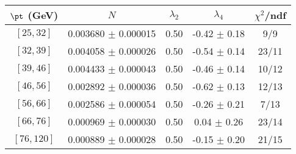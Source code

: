 \begin{tabular}{c||c|c|c|c}
$\pt$ (GeV) & $N$ & $\lambda_{2}$ & $\lambda_4$  & $\chi^2$/ndf  \\
\hline
$[25, 32]$ & 0.003680 $\pm$ 0.000015 & 0.50 & -0.42 $\pm$ 0.18 & 9/9\\
$[32, 39]$ & 0.004058 $\pm$ 0.000026 & 0.50 & -0.54 $\pm$ 0.14 & 23/11\\
$[39, 46]$ & 0.004433 $\pm$ 0.000043 & 0.50 & -0.46 $\pm$ 0.14 & 10/12\\
$[46, 56]$ & 0.002892 $\pm$ 0.000036 & 0.50 & -0.62 $\pm$ 0.13 & 12/13\\
$[56, 66]$ & 0.002586 $\pm$ 0.000054 & 0.50 & -0.26 $\pm$ 0.21 & 7/13\\
$[66, 76]$ & 0.000969 $\pm$ 0.000030 & 0.50 & 0.04 $\pm$ 0.26 & 23/14\\
$[76, 120]$ & 0.000889 $\pm$ 0.000028 & 0.50 & -0.15 $\pm$ 0.20 & 21/15\\
\end{tabular}
